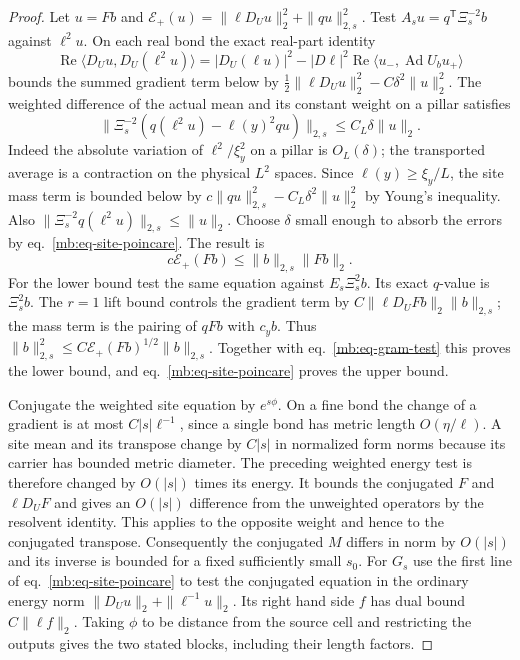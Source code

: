 \documentclass[11pt,letterpaper,reqno]{amsart}
\numberwithin{equation}{section}
\renewcommand{\eqref}[1]{\textup{eq.~\ref{#1}}}
\theoremstyle{definition}
\theoremstyle{remark}
\begin{document}
\begin{proof}
Let \(u=Fb\) and
\(\mathcal E_+(u)=\|\ell D_Uu\|_2^2+\|qu\|_{2,s}^2\).
Test \(A_su=q^{\mathsf T}\Xi_s^{-2}b\) against
\(\ell^2u\). On each real bond the exact real-part identity
\[
 \operatorname{Re}\langle D_Uu,D_U(\ell^2u)\rangle
    = |D_U(\ell u)|^2
       -|D\ell|^2\operatorname{Re}
           \langle u_-,\operatorname{Ad}U_b u_+\rangle
\]
bounds the summed gradient term below by
\(\tfrac12\|\ell D_Uu\|_2^2-C\delta^2\|u\|_2^2\).
The weighted difference of the actual mean and its constant
weight on a pillar satisfies
\[
 \|\Xi_s^{-2}(q(\ell^2u)-\ell(y)^2 qu)\|_{2,s}
                     \le C_L\delta\|u\|_2 .
\]
Indeed the absolute variation of \(\ell^2/\xi_y^2\) on
a pillar is \(O_L(\delta)\); the transported average is a
contraction on the physical \(L^2\) spaces. Since
\(\ell(y)\ge\xi_y/L\), the site mass term is bounded below
by \(c\|qu\|_{2,s}^2-C_L\delta^2\|u\|_2^2\) by Young's
inequality. Also \(\|\Xi_s^{-2}q(\ell^2u)\|_{2,s}\le\|u\|_2\).
Choose \(\delta\) small enough to absorb the errors by
\eqref{mb:eq-site-poincare}. The result is
\begin{equation}\label{mb:eq-gram-test}
       c\mathcal E_+(Fb)\le \|b\|_{2,s}\|Fb\|_2 .
\end{equation}
For the lower bound test the same equation against
\(E_s\Xi_s^2b\). Its exact \(q\)-value is \(\Xi_s^2b\).
The \(r=1\) lift bound controls the gradient term by
\(C\|\ell D_UFb\|_2\|b\|_{2,s}\); the mass term is the
pairing of \(qFb\) with \(c_y b\). Thus
\(\|b\|_{2,s}^2\le C\mathcal E_+(Fb)^{1/2}\|b\|_{2,s}\).
Together with \eqref{mb:eq-gram-test} this proves the lower
bound, and \eqref{mb:eq-site-poincare} proves the upper bound.

Conjugate the weighted site equation by \(e^{s\phi}\).
On a fine bond the change of a gradient is at most
\(C|s|\ell^{-1}\), since a single bond has metric length
\(O(\eta/\ell)\). A site mean and its transpose change by
\(C|s|\) in normalized form norms because its carrier has
bounded metric diameter. The preceding weighted energy test
is therefore changed by \(O(|s|)\) times its energy. It
bounds the conjugated \(F\) and \(\ell D_UF\) and gives an
\(O(|s|)\) difference from the unweighted operators by the
resolvent identity. This applies to the opposite weight
and hence to the conjugated transpose. Consequently the
conjugated \(M\) differs in norm by \(O(|s|)\) and its
inverse is bounded for a fixed sufficiently small \(s_0\).
For \(G_s\) use the first line of \eqref{mb:eq-site-poincare}
to test the conjugated equation in the ordinary energy norm
\(\|D_Uu\|_2+\|\ell^{-1}u\|_2\). Its right hand side \(f\)
has dual bound \(C\|\ell f\|_2\). Taking \(\phi\) to be
distance from the source cell and restricting the outputs
gives the two stated blocks, including their length factors.


\end{proof}
\end{document}
